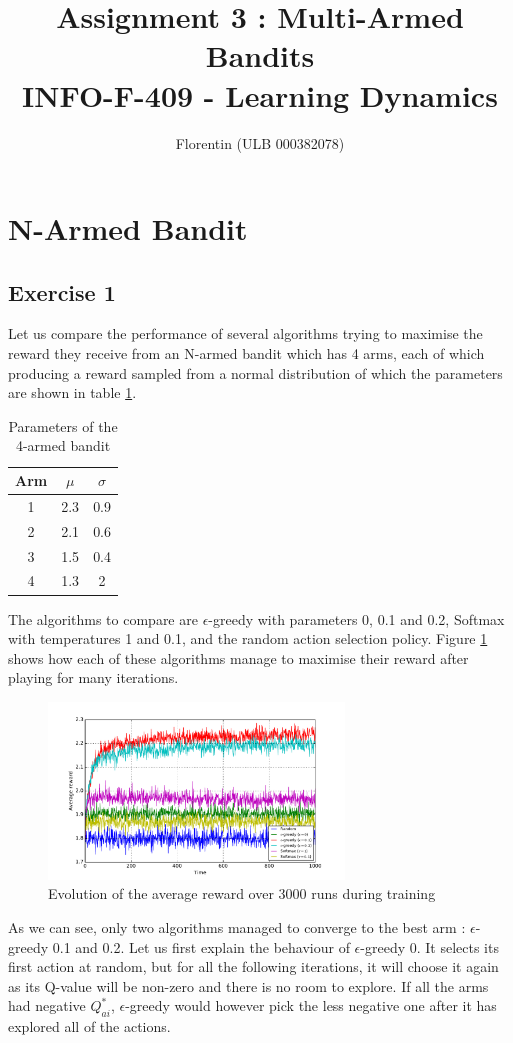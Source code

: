 \documentclass[a4paper]{article}
\title{
    Assignment 3 : Multi-Armed Bandits\\
    \small INFO-F-409 - Learning Dynamics
}
\author{Florentin \bsc{Hennecker} (ULB 000382078)}
\date{}
\begin{document}
\maketitle

\section{N-Armed Bandit}
\subsection{Exercise 1}

Let us compare the performance of several algorithms trying to maximise the
reward they receive from an N-armed bandit which has 4 arms, each of which 
producing a reward sampled from a normal distribution of which the parameters
are shown in table \ref{banditparams}.

\begin{table}[H]
\centering
\begin{tabular}{c|c|c}
	\textbf{Arm} & $\mu$ & $\sigma$ \\
	\hline
	1 & 2.3 & 0.9\\
	2 & 2.1 & 0.6\\
	3 & 1.5 & 0.4\\
	4 & 1.3 & 2\\
\end{tabular}
\caption{Parameters of the 4-armed bandit}
\label{banditparams}
\end{table}

The algorithms to compare are $\epsilon$-greedy with parameters 0, 0.1 and 0.2,
Softmax with temperatures 1 and 0.1, and the random action selection policy.
Figure \ref{ex11perf} shows how each of these algorithms manage to maximise
their reward after playing for many iterations. 
\begin{figure}[H]
	\centering
	\includegraphics[width=0.7\textwidth]{./fig/ex1-1.pdf}
	\caption{Evolution of the average reward over 3000 runs during training}
	\label{ex11perf}
\end{figure}
As we can see, only two algorithms managed to converge to the best arm : 
$\epsilon$-greedy 0.1 and 0.2. Let us first explain the behaviour of 
$\epsilon$-greedy 0. It selects its first action at random, but for all the
following iterations, it will choose it again as its Q-value will be non-zero
and there is no room to explore. If all the arms had negative $Q^*_{ai}$, 
$\epsilon$-greedy would however pick the less negative one after it has explored
all of the actions.\\
\end{document}

